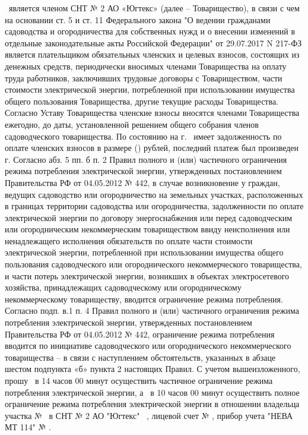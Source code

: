   \ является членом СНТ № 2 АО «Югтекс» (далее – Товарищество), %
в связи с чем на основании ст. 5 и ст. 11    Федерального закона  "О ведении гражданами садоводства и огородничества для собственных нужд и о внесении изменений в отдельные законодательные акты Российской Федерации"   от 29.07.2017 N 217-ФЗ является плательщиком обязательных членских и целевых взносов, состоящих из денежных средств, периодически вносимых членами Товарищества на оплату труда работников, заключивших трудовые договоры с Товариществом, части стоимости электрической энергии, потребленной при использовании имущества общего пользования Товарищества,
другие текущие расходы Товарищества. 
Согласно Уставу Товарищества членские взносы вносятся членами Товарищества
ежегодно, до даты, установленной решением общего собрания членов садоводческого товарищества.  
По состоянию на   г.    \ имеет  задолженность по оплате членских взносов в размере  () рублей,  последний платеж был произведен  г.
Согласно абз. 5 пп. б п. 2 Правил полного и (или) частичного ограничения режима потребления электрической энергии, утвержденных постановлением Правительства РФ от 04.05.2012 № 442, в случае возникновение у граждан, ведущих садоводство или огородничество на земельных участках, расположенных в границах территории садоводства или огородничества, задолженности по оплате электрической энергии по договору энергоснабжения или перед садоводческим или огородническим некоммерческим товариществом ввиду неисполнения или ненадлежащего исполнения обязательств по оплате части стоимости электрической энергии, потребленной при использовании имущества общего пользования садоводческого или огороднического некоммерческого товарищества, и части потерь электрической энергии, возникших в объектах электросетевого хозяйства, принадлежащих садоводческому или огородническому некоммерческому товариществу, вводится ограничение режима потребления.
Согласно подп. в.1 п. 4 Правил полного и (или) частичного ограничения режима потребления электрической энергии, утвержденных постановлением Правительства РФ от 04.05.2012 № 442, ограничение режима потребления вводится по инициативе садоводческого или огороднического некоммерческого товарищества – в связи с наступлением обстоятельств, указанных в абзаце шестом подпункта «б» пункта 2 настоящих Правил.
С учетом вышеизложенного,  прошу  \, в 14 часов 00 минут   осуществить частичное ограничение режима потребления электрической энергии, а   \, в 10 часов 00 минут  осуществить полное ограничение режима потребления электрической энергии в отношении владельца участка №  \ в СНТ № 2 АО "Югтекс" \ , лицевой счет № , прибор учета "НЕВА МТ 114" \. № . 


\vspace{10mm}
\pagebreak
